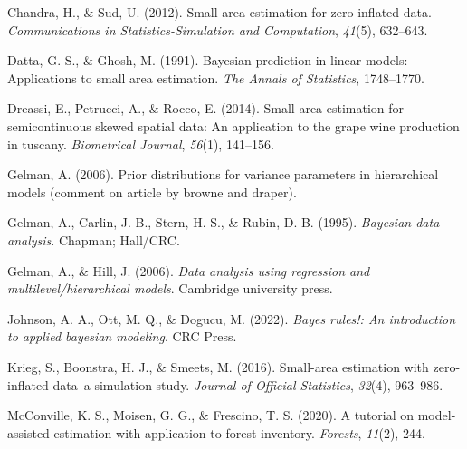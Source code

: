 \documentclass[12pt,twoside]{reedthesis}
\newlength{\cslhangindent}
\newenvironment{CSLReferences}[2] %
 {%
  \setlength{\parindent}{0pt}
  \ifodd #1 \everypar{\setlength{\hangindent}{\cslhangindent}}\ignorespaces\fi
  \ifnum #2 > 0
  \setlength{\parskip}{#2\baselineskip}
  \fi
 }%
 {}
\begin{document}

\noindent

\setlength{\parindent}{-0.20in}

\hypertarget{refs}{}
\begin{CSLReferences}{1}{0}
\leavevmode{}%
Chandra, H., \& Sud, U. (2012). Small area estimation for zero-inflated data. \emph{Communications in Statistics-Simulation and Computation}, \emph{41}(5), 632--643.

\leavevmode{}%
Datta, G. S., \& Ghosh, M. (1991). Bayesian prediction in linear models: Applications to small area estimation. \emph{The Annals of Statistics}, 1748--1770.

\leavevmode{}%
Dreassi, E., Petrucci, A., \& Rocco, E. (2014). Small area estimation for semicontinuous skewed spatial data: An application to the grape wine production in tuscany. \emph{Biometrical Journal}, \emph{56}(1), 141--156.

\leavevmode{}%
Gelman, A. (2006). Prior distributions for variance parameters in hierarchical models (comment on article by browne and draper).

\leavevmode{}%
Gelman, A., Carlin, J. B., Stern, H. S., \& Rubin, D. B. (1995). \emph{Bayesian data analysis}. Chapman; Hall/CRC.

\leavevmode{}%
Gelman, A., \& Hill, J. (2006). \emph{Data analysis using regression and multilevel/hierarchical models}. Cambridge university press.

\leavevmode{}%
Johnson, A. A., Ott, M. Q., \& Dogucu, M. (2022). \emph{Bayes rules!: An introduction to applied bayesian modeling}. CRC Press.

\leavevmode{}%
Krieg, S., Boonstra, H. J., \& Smeets, M. (2016). Small-area estimation with zero-inflated data--a simulation study. \emph{Journal of Official Statistics}, \emph{32}(4), 963--986.

\leavevmode{}%
McConville, K. S., Moisen, G. G., \& Frescino, T. S. (2020). A tutorial on model-assisted estimation with application to forest inventory. \emph{Forests}, \emph{11}(2), 244.


\end{CSLReferences}
\end{document}
